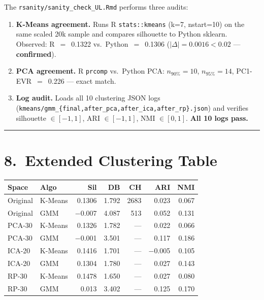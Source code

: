 \documentclass[11pt]{article}
\begin{document}
The \texttt{rsanity/sanity\_check\_UL.Rmd} performs three audits:

\begin{enumerate}
  \item \textbf{K-Means agreement.} Runs R \texttt{stats::kmeans} (k=7,
        nstart=10) on the same scaled 20k sample and compares silhouette
        to Python sklearn. Observed: R~$=$~0.1322 vs.\ Python~$=$~0.1306
        ($|\Delta|{=}0.0016 < 0.02$ --- \textbf{confirmed}).
  \item \textbf{PCA agreement.} R \texttt{prcomp} vs.\ Python PCA:
        $n_{90\%}{=}10$, $n_{95\%}{=}14$, PC1-EVR~$=$~0.226 --- exact match.
  \item \textbf{Log audit.} Loads all 10 clustering JSON logs
        (\texttt{kmeans/gmm\_\{final,after\_pca,after\_ica,after\_rp\}.json})
        and verifies silhouette $\in [-1,1]$, ARI $\in [-1,1]$,
        NMI $\in [0,1]$. \textbf{All 10 logs pass.}
\end{enumerate}

{\color{denimmid}\rule{\linewidth}{0.4pt}}

\section*{8.\ Extended Clustering Table}

\begin{center}
\small
\begin{tabular}{llrrrrr}
\toprule
\textbf{Space} & \textbf{Algo} & \textbf{Sil} & \textbf{DB} &
\textbf{CH} & \textbf{ARI} & \textbf{NMI} \\
\midrule
Original & K-Means & 0.1306 & 1.792 & 2683 & 0.023 & 0.067 \\
Original & GMM     & $-$0.007 & 4.087 & 513 & 0.052 & 0.131 \\
PCA-30   & K-Means & 0.1326 & 1.782 & --- & 0.022 & 0.066 \\
PCA-30   & GMM     & $-$0.001 & 3.501 & --- & 0.117 & 0.186 \\
ICA-20   & K-Means & 0.1416 & 1.701 & --- & $-$0.005 & 0.105 \\
ICA-20   & GMM     & 0.1304 & 1.780 & --- & 0.027 & 0.143 \\
RP-30    & K-Means & 0.1478 & 1.650 & --- & 0.027 & 0.080 \\
RP-30    & GMM     & 0.013  & 3.402 & --- & 0.125 & 0.170 \\
\bottomrule
\end{tabular}
\end{center}
\end{document}

